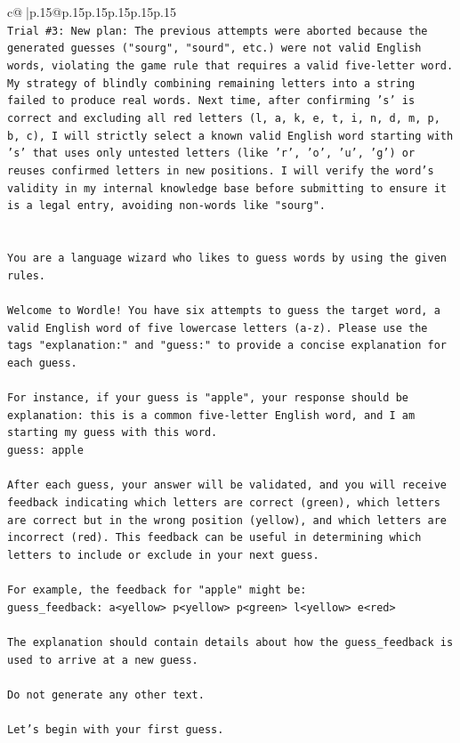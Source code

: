 \documentclass{article}
\begin{document}
{\begin{supertabular}{c@{$\;$}|p{.15\linewidth}@{}p{.15\linewidth}p{.15\linewidth}p{.15\linewidth}p{.15\linewidth}p{.15\linewidth}}
{{{\\ 
\texttt{Trial \#3: New plan: The previous attempts were aborted because the generated guesses ("sourg", "sourd", etc.) were not valid English words, violating the game rule that requires a valid five{-}letter word. My strategy of blindly combining remaining letters into a string failed to produce real words. Next time, after confirming 's' is correct and excluding all red letters (l, a, k, e, t, i, n, d, m, p, b, c), I will strictly select a known valid English word starting with 's' that uses only untested letters (like 'r', 'o', 'u', 'g') or reuses confirmed letters in new positions. I will verify the word's validity in my internal knowledge base before submitting to ensure it is a legal entry, avoiding non{-}words like "sourg".} \\
\\ 
\\ 
\texttt{You are a language wizard who likes to guess words by using the given rules.} \\
\\ 
\texttt{Welcome to Wordle! You have six attempts to guess the target word, a valid English word of five lowercase letters (a{-}z). Please use the tags "explanation:" and "guess:" to provide a concise explanation for each guess.} \\
\\ 
\texttt{For instance, if your guess is "apple", your response should be} \\
\texttt{explanation: this is a common five{-}letter English word, and I am starting my guess with this word.} \\
\texttt{guess: apple} \\
\\ 
\texttt{After each guess, your answer will be validated, and you will receive feedback indicating which letters are correct (green), which letters are correct but in the wrong position (yellow), and which letters are incorrect (red). This feedback can be useful in determining which letters to include or exclude in your next guess.} \\
\\ 
\texttt{For example, the feedback for "apple" might be:} \\
\texttt{guess\_feedback: a<yellow> p<yellow> p<green> l<yellow> e<red>} \\
\\ 
\texttt{The explanation should contain details about how the guess\_feedback is used to arrive at a new guess.} \\
\\ 
\texttt{Do not generate any other text.} \\
\\ 
\texttt{Let's begin with your first guess.} \\
            }
        }
    }
     \\ \\


\end{supertabular}}
\end{document}
